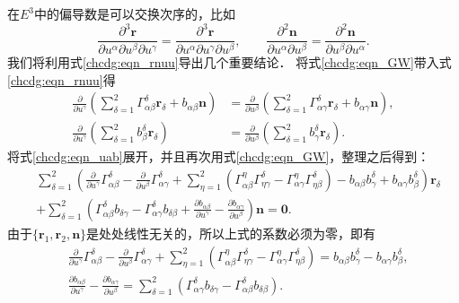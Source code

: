 在$E^3$中的偏导数是可以交换次序的，比如
\begin{equation}\label{chcdg:eqn_rnuu}
    \frac{\partial^3 \boldsymbol{r}}{\partial u^\alpha \partial u^\beta \partial u^\gamma}
    =\frac{\partial^3 \boldsymbol{r}}{\partial u^\alpha \partial u^\gamma \partial u^\beta  },\qquad
    \frac{\partial^2 \boldsymbol{n}}{\partial u^\alpha \partial u^\beta }
    =\frac{\partial^2 \boldsymbol{n}}{\partial u^\beta \partial u^\alpha  } .
\end{equation}
我们将利用式\eqref{chcdg:eqn_rnuu}导出几个重要结论．
将式\eqref{chcdg:eqn_GW}带入式\eqref{chcdg:eqn_rnuu}得
\begin{align}
    \frac{\partial}{\partial u^\gamma}\left(\sum_{\delta=1}^{2}\Gamma_{\alpha \beta}^\delta \boldsymbol{r}_\delta 
    +b_{\alpha \beta}\boldsymbol{n}\right)    & =\frac{\partial}{\partial u^\beta}
    \left(\sum_{\delta=1}^{2} \Gamma_{\alpha \gamma}^\delta \boldsymbol{r}_\delta
    +b_{\alpha \gamma} \boldsymbol{n}\right), \label{chcdg:eqn_uab}  \\
    \frac{\partial}{\partial u^\gamma}\left(\sum_{\delta=1}^{2} b_\beta^\delta \boldsymbol{r}_\delta\right) 
    & =\frac{\partial}{\partial u^\beta}\left(\sum_{\delta=1}^{2} b_\gamma^\delta \boldsymbol{r}_\delta\right) . \label{chcdg:eqn_nab}
\end{align}
将式\eqref{chcdg:eqn_uab}展开，并且再次用式\eqref{chcdg:eqn_GW}，整理之后得到：
\begin{align*}
    &\sum_{\delta=1}^{2}\left(\frac{\partial}{\partial u^\gamma} \Gamma_{\alpha \beta}^\delta
    -\frac{\partial}{\partial u^\beta} \Gamma_{\alpha \gamma}^\delta
    + \sum_{\eta=1}^{2}\left(\Gamma_{\alpha \beta}^\eta \Gamma_{\eta \gamma}^\delta
    -\Gamma_{\alpha \gamma}^\eta \Gamma_{\eta \beta}^\delta\right)
    -b_{\alpha \beta} b_\gamma^\delta+b_{\alpha \gamma} b_\beta^\delta\right) \boldsymbol{r}_\delta  \\
    &+\sum_{\delta=1}^{2}\left(\Gamma_{\alpha \beta}^\delta b_{\delta \gamma}-\Gamma_{\alpha \gamma}^\delta
     b_{\delta \beta}+\frac{\partial b_{\alpha \beta}}{\partial u^\gamma}
     -\frac{\partial b_{\alpha \gamma}}{\partial u^\beta}\right) \boldsymbol{n}=\boldsymbol{0} .
\end{align*}
由于$\{\boldsymbol{r}_1, \boldsymbol{r}_2, \boldsymbol{n}\}$是处处线性无关的，所以上式的系数必须为零，即有
\begin{align}
    &\frac{\partial}{\partial u^\gamma} \Gamma_{\alpha \beta}^\delta-\frac{\partial}{\partial u^\beta}
   \Gamma_{\alpha \gamma}^\delta+ \sum_{\eta=1}^{2}\left(\Gamma_{\alpha \beta}^\eta 
    \Gamma_{\eta \gamma}^\delta-\Gamma_{\alpha \gamma}^\eta \Gamma_{\eta \beta}^\delta\right)
    =b_{\alpha \beta} b_\gamma^\delta-b_{\alpha \gamma} b_\beta^\delta, \label{chcdg:eqn_Gauss} \\
    &\frac{\partial b_{\alpha \beta}}{\partial u^\gamma}-\frac{\partial b_{\alpha \gamma}}{\partial u^\beta}
    =\sum_{\delta=1}^{2}\left(\Gamma_{\alpha \gamma}^\delta b_{\delta \gamma}
    - \Gamma_{\alpha \beta}^\delta b_{\delta \beta}\right).     \label{chcdg:eqn_Codazzi}
\end{align}
